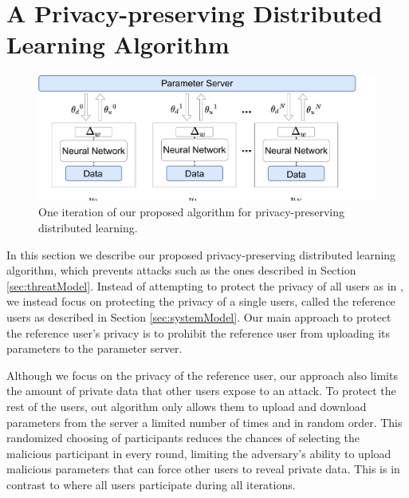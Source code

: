 \documentclass[conference]{IEEEtran}
\begin{document}
\section{A Privacy-preserving Distributed Learning Algorithm}
\begin{figure}[t]
\includegraphics[width=\textwidth, keepaspectratio]{HighLevelArch}
\caption{One iteration of our proposed algorithm for privacy-preserving distributed learning.}
\label{fig:HighLevel}
\end{figure}
In this section we describe our proposed privacy-preserving distributed learning algorithm, which prevents attacks
such as the ones described in Section \ref{sec:threatModel}. Instead of attempting to protect the privacy of all users as in 
\cite{shokri2015privacy}, we instead focus on protecting the privacy of a single users, called the reference users as described in
Section \ref{sec:systemModel}. Our main approach to protect the reference user's privacy is to prohibit the reference user
from uploading its parameters to the  parameter server. 

Although we focus on the privacy of the reference user, our approach also
limits the amount of private data that other users expose to an attack. To protect the rest of the users, out algorithm only allows
them to upload and download parameters from the server a limited number of times and in random order. 
This randomized choosing of participants reduces the chances of selecting the malicious participant in every round, limiting
the adversary's ability to upload malicious parameters that can force other users to reveal private data. 
This is in contrast to \cite{shokri2015privacy} where all users participate during all iterations. 

\end{document}

